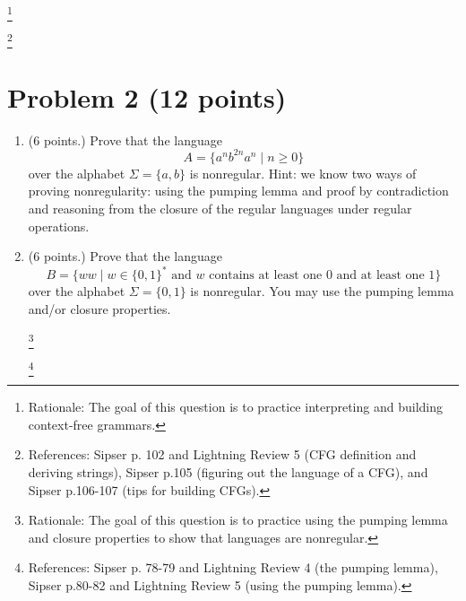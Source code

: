 \documentclass[letterpaper,11pt,twoside]{article}
\theoremstyle{plain}
\theoremstyle{definition}
\theoremstyle{remark}
\theoremstyle{restate}
\newcommand\blfootnote[1]{%
  \begingroup
  \renewcommand\thefootnote{}\footnote{#1}%
  \addtocounter{footnote}{-1}%
  \endgroup
}
\begin{document}
    \blfootnote{ Rationale: The goal of this question is to practice interpreting and building context-free grammars. }
    \blfootnote{ References: Sipser p. 102 and Lightning Review 5 (CFG definition and deriving strings), Sipser p.105 (figuring out the language of a CFG), and Sipser p.106-107 (tips for building CFGs). }



\clearpage
\section{Problem 2 (12 points)}

\begin{enumerate}
    \item (6 points.) Prove that the language
    \[
        A = \{a^nb^{2n}a^n \; | \; n \geq 0\}
    \]
    over the alphabet $\Sigma = \{a,b\}$ is nonregular. Hint: we know two ways of proving nonregularity: using the pumping lemma and proof by contradiction and reasoning from the closure of the regular languages under regular operations.

    \item (6 points.) Prove that the language
    \[
        B = \{ww \; | \; w \in \{0,1\}^* \text{ and } w \text{ contains at least one 0 and at least one 1}\}
    \]
    over the alphabet $\Sigma = \{0,1\}$ is nonregular. You may use the pumping lemma and/or closure properties.
    
    \blfootnote{ Rationale: The goal of this question is to practice using the pumping lemma and closure properties to show that languages are nonregular. }
    \blfootnote{ References: Sipser p. 78-79 and Lightning Review 4 (the pumping lemma), Sipser p.80-82 and Lightning Review 5 (using the pumping lemma). }
\end{enumerate}

\clearpage
\end{document}
